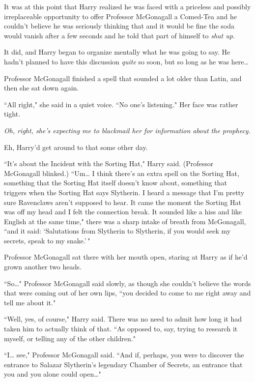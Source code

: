 It was at this point that Harry realized he was faced with a priceless and possibly irreplaceable opportunity to offer Professor McGonagall a Comed-Tea and he couldn't believe he was seriously thinking that and it would be fine the soda would vanish after a few seconds and he told that part of himself to \emph{shut up}.

It did, and Harry began to organize mentally what he was going to say. He hadn't planned to have this discussion \emph{quite} so soon, but so long as he was here{\ldots}

Professor McGonagall finished a spell that sounded a lot older than Latin, and then she sat down again.

``All right," she said in a quiet voice. ``No one's listening." Her face was rather tight.

\emph{Oh, right, she's expecting me to blackmail her for information about the prophecy.}

Eh, Harry'd get around to that some other day.

``It's about the Incident with the Sorting Hat," Harry said. (Professor McGonagall blinked.) ``Um{\ldots} I think there's an extra spell on the Sorting Hat, something that the Sorting Hat itself doesn't know about, something that triggers when the Sorting Hat says Slytherin. I heard a message that I'm pretty sure Ravenclaws aren't supposed to hear. It came the moment the Sorting Hat was off my head and I felt the connection break. It sounded like a hiss and like English at the same time," there was a sharp intake of breath from McGonagall, ``and it said: `Salutations from Slytherin to Slytherin, if you would seek my secrets, speak to my snake.'\,"

Professor McGonagall sat there with her mouth open, staring at Harry as if he'd grown another two heads.

``So{\ldots}" Professor McGonagall said slowly, as though she couldn't believe the words that were coming out of her own lips, ``you decided to come to me right away and tell me about it."

``Well, yes, of course," Harry said. There was no need to admit how long it had taken him to actually think of that. ``As opposed to, say, trying to research it myself, or telling any of the other children."

``I{\ldots} see," Professor McGonagall said. ``And if, perhaps, you were to discover the entrance to Salazar Slytherin's legendary Chamber of Secrets, an entrance that you and you alone could open{\ldots}"

